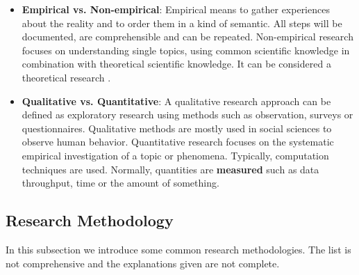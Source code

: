 \begin{itemize}
\item  \textbf{Empirical vs. Non-empirical}: Empirical means to gather experiences about the reality and to order them in a kind of semantic. All steps will be documented, are comprehensible and can be repeated.
Non-empirical research focuses on understanding single topics, using common scientific knowledge in combination with theoretical scientific knowledge. It can be considered a theoretical research \cite{hans2005methoden}.

\item \textbf{Qualitative vs. Quantitative}: A qualitative research approach can be defined as exploratory research using methods such as observation, surveys or questionnaires. Qualitative methods are mostly used in social sciences to observe human behavior. Quantitative research focuses on the systematic empirical investigation of a topic or phenomena. Typically, computation techniques are used. Normally, quantities are \textbf{measured} such as data throughput, time or the amount of something.

\end{itemize}

\subsection{Research Methodology}

In this subsection we introduce some common research methodologies. The list is not comprehensive and the explanations given are not complete. \\


